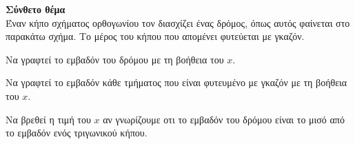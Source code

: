 \documentclass[ektypwsh]{diag-xelatex}
\begin{document}
\begin{thema}
\begin{multicols}{3}
\begin{rlist}
\end{rlist}
\end{multicols}
\item \textbf{Σύνθετο θέμα}\\
Έναν κήπο σχήματος ορθογωνίου τον διασχίζει ένας δρόμος, όπως αυτός φαίνεται στο παρακάτω σχήμα. Το μέρος του κήπου που απομένει φυτεύεται με γκαζόν.
\begin{center}
\end{center}
\begin{rlist}
\item Να γραφτεί το εμβαδόν του δρόμου με τη βοήθεια του $ x $.
\item Να γραφτεί το εμβαδόν κάθε τμήματος που είναι φυτευμένο με γκαζόν με τη βοήθεια του $ x $.
\item Να βρεθεί η τιμή του $ x $ αν γνωρίζουμε οτι το εμβαδόν του δρόμου είναι το μισό από το εμβαδόν ενός τριγωνικού κήπου.
\end{rlist}
\end{thema}
\gymnasio
\kaliepityxia
\end{document}
